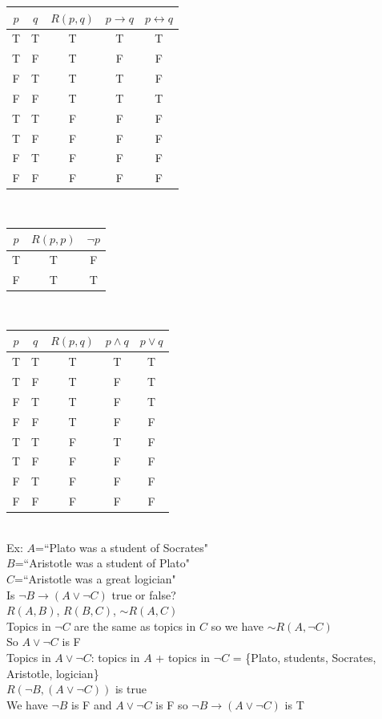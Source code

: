 \documentclass[11pt, fleqn]{article}
\begin{document}
\begin{tabular}{ccccc}
    $p$ & $q$ & $R(p,q)$ & $p\to q$ & $p\leftrightarrow q$\\
    \hline
    T & T & T & T & T\\
    T & F & T & F & F\\
    F & T & T & T & F\\
    F & F & T & T & T\\
    T & T & F & F & F\\
    T & F & F & F & F\\
    F & T & F & F & F\\
    F & F & F & F & F
\end{tabular}\\
\begin{tabular}{ccc}
    $p$ & $R(p,p)$ & $\lnot p$\\
    \hline
    T & T & F\\
    F & T & T
\end{tabular}\\
\begin{tabular}{ccccc}
    $p$ & $q$ & $R(p,q)$ & $p\wedge q$ & $p\vee q$\\
    \hline
    T & T & T & T & T\\
    T & F & T & F & T\\
    F & T & T & F & T\\
    F & F & T & F & F\\
    T & T & F & T & F\\
    T & F & F & F & F\\
    F & T & F & F & F\\
    F & F & F & F & F
\end{tabular}\\
Ex: $A$=``Plato was a student of Socrates"\\
$B$=``Aristotle was a student of Plato"\\
$C$=``Aristotle was a great logician"\\
Is $\lnot B\to(A\vee \lnot C)$ true or false?\\
$R(A,B)$, $R(B,C)$, $\sim R(A,C)$\\
Topics in $\lnot C$ are the same as topics in $C$ so we have $\sim R(A,\lnot C)$\\
So $A\vee \lnot C$ is F\\
Topics in $A\vee \lnot C$: topics in $A$ + topics in $\lnot C$ = \{Plato, students, Socrates, Aristotle, logician\}\\
$R(\lnot B,(A\vee\lnot C))$ is true\\
We have $\lnot B$ is F and $A\vee\lnot C$ is F so $\lnot B\to(A\vee\lnot C)$ is T\\
\end{document}
